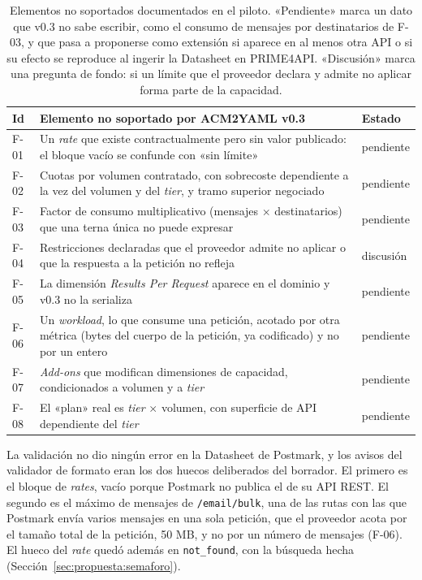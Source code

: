 \begin{table}[tbp]
\centering
\small
\begin{tabular}{|l|>{\raggedright\arraybackslash}p{8.6cm}|l|}
\hline
\textbf{Id} & \textbf{Elemento no soportado por ACM2YAML v0.3} & \textbf{Estado} \\
\hline
F-01 & Un \textit{rate} que existe contractualmente pero sin valor
publicado: el bloque vacío se confunde con «sin límite» & pendiente \\
\hline
F-02 & Cuotas por volumen contratado, con sobrecoste dependiente a la vez
del volumen y del \textit{tier}, y tramo superior negociado & pendiente \\
\hline
F-03 & Factor de consumo multiplicativo (mensajes $\times$
destinatarios) que una terna única no puede expresar & pendiente \\
\hline
F-04 & Restricciones declaradas que el proveedor admite no aplicar o que
la respuesta a la petición no refleja & discusión \\
\hline
F-05 & La dimensión \textit{Results Per Request} aparece en el
dominio y v0.3 no la serializa & pendiente \\
\hline
F-06 & Un \textit{workload}, lo que consume una petición, acotado por otra métrica (bytes del
cuerpo de la petición, ya codificado) y no por un entero & pendiente \\
\hline
F-07 & \textit{Add-ons} que modifican dimensiones de capacidad,
condicionados a volumen y a \textit{tier} & pendiente \\
\hline
F-08 & El «plan» real es \textit{tier} $\times$ volumen, con superficie
de API dependiente del \textit{tier} & pendiente \\
\hline
\end{tabular}
\caption[Elementos no soportados documentados en el piloto]{Elementos no soportados documentados en el piloto. «Pendiente» marca un dato que v0.3 no sabe escribir, como el consumo de mensajes por destinatarios de F-03, y que pasa a proponerse como extensión si aparece en al menos otra API o si su efecto se reproduce al ingerir la Datasheet en PRIME4API. «Discusión» marca una pregunta de fondo: si un límite que el proveedor declara y admite no aplicar forma parte de la capacidad.}
\label{tab:fricciones}
\end{table}

La validación no dio ningún error en la Datasheet de Postmark, y los avisos del validador de formato eran los dos huecos deliberados del borrador.
El primero es el bloque de \textit{rates}, vacío porque Postmark no publica el de su API REST.
El segundo es el máximo de mensajes de \texttt{/email/bulk}, una de las rutas con las que Postmark envía varios mensajes en una sola petición, que el proveedor acota por el tamaño total de la petición, 50 MB, y no por un número de mensajes (F-06).
El hueco del \textit{rate} quedó además en \texttt{not\_found}, con la búsqueda hecha (Sección~\ref{sec:propuesta:semaforo}).

